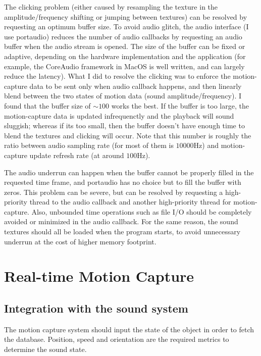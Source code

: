 \documentclass[tog]{acmsiggraph}
\begin{document}
The clicking problem (either caused by resampling the texture in the amplitude/frequency shifting or jumping between textures) can be resolved by requesting an optimum buffer size. To avoid audio glitch, the audio interface (I use portaudio) reduces the number of audio callbacks by requesting an audio buffer when the audio stream is opened. The size of the buffer can be fixed or adaptive, depending on the hardware implementation and the application (for example, the CoreAudio framework in MacOS is well written, and can largely reduce the latency). What I did to resolve the clicking was to enforce the motion-capture data to be sent only when audio callback happens, and then linearly blend between the two states of motion data (sound amplitude/frequency). I found that the buffer size of $\sim100$ works the best. If the buffer is too large, the motion-capture data is updated infrequenctly and the playback will sound sluggish; whereas if its too small, then the buffer doesn't have enough time to blend the textures and clicking will occur. Note that this number is roughly the ratio between audio sampling rate (for most of them is $10000$Hz) and motion-capture update refresh rate (at around $100$Hz).

The audio underrun can happen when the buffer cannot be properly filled in the requested time frame, and portaudio has no choice but to fill the buffer with zeros. This problem can be severe, but can be resolved by requesting a high-priority thread to the audio callback and another high-priority thread for motion-capture. Also, unbounded time operations such as file I/O should be completely avoided or minimized in the audio callback. For the same reason, the sound textures should all be loaded when the program starts, to avoid unnecessary underrun at the cost of higher memory footprint.



\section{Real-time Motion Capture} \label{section:leap_motion}


\subsection{Integration with the sound system}

The motion capture system should input the state of the object in order to fetch the database. Position, speed and orientation are the required metrics to determine the sound state.  
\end{document}
